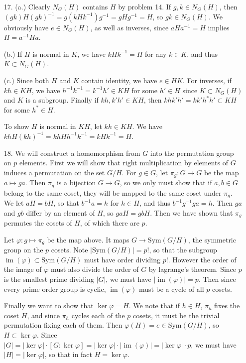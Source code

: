 \documentclass[11pt, reqno]{article}
\theoremstyle{plain}
\theoremstyle{definition}
\theoremstyle{remark}
\renewcommand{\phi}{\varphi}
\DeclareMathOperator{\ima}{\text{im}}
\begin{document}
\begin{enumerate}
    \item[17.] (a.) Clearly $N_G(H)$ contains $H$ by problem 14. If $g, k \in N_G(H)$, then 
    $(gk)H(gk)^{-1} = g(kHk^{-1})g^{-1} = gHg^{-1} = H$, so $gk \in N_G(H)$. We obviously have $e \in N_G(H)$,
    as well as inverses, since $aHa^{-1} = H$ implies $H = a^{-1} H a$.

    (b.) If $H$ is normal in $K$, we have $kHk^{-1} = H$ for any $k \in K$, and thus $K \subset N_G(H)$. 

    (c.) Since both $H$ and $K$ contain identity, we have $e \in HK$. For inverses, if $kh \in KH$,
    we have $h^{-1}k^{-1} = k^{-1}h' \in KH$ for some $h' \in H$ since $K \subset N_G(H)$ and $K$
    is a subgroup. Finally if $kh, k'h' \in KH$, then $khk'h' = kk'h^*h' \subset KH$ for some $h^* \in H$.

    To show $H$ is normal in $KH$, let $kh \in KH$. We have $kh H (kh)^{-1} = kh H h^{-1} k^{-1} = k H k^{-1} = H$.

    \item[18.] We will construct a homomorphism from $G$ into the permutation group on $p$ elements. 
    First we will show that right multiplication by elements of $G$ induces a permutation on the set $G/H$.
    For $g \in G$, let $\pi_g: G \rightarrow G$ be the map $a \mapsto ga$. Then $\pi_g$ 
    is a bijection $G \rightarrow G$, so we only must show that if $a, b \in G$ belong to the same coset, 
    they will be mapped to the same coset under $\pi_g$. We let $aH = bH$, so that $b^{-1}a = h$ for $h \in H$,
    and thus $b^{-1}g^{-1}ga = h$. Then $ga$ and $gb$ differ by an element of $H$, so $gaH = gbH$. Then we have
    shown that $\pi_g$ permutes the cosets of $H$, of which there are $p$. 

    Let $\phi: g \mapsto \pi_g$ be the map above. It maps $G \rightarrow \text{Sym}(G/H)$, the symmetric group 
    on the $p$ cosets. Note $|\text{Sym}(G/H)| = p!$, so that the subgroup $\ima(\phi) \subset \text{Sym}(G/H)$
    must have order dividing $p!$. 
    However the order of the image of $\phi$ must also divide the order of $G$
    by lagrange's theorem. Since $p$ is the smallest prime dividing $|G|$, we must have $|\ima(\phi)| = p$.
    Then since every prime order group is cyclic, $\ima(\phi)$ must be a cycle of all $p$ cosets. 

    Finally we want to show that $\ker\phi = H$. We note that if $h \in H$, $\pi_h$ fixes the coset $H$,
    and since $\pi_h$ cycles each of the $p$ cosets, it must be the trivial permutation fixing each of them. 
    Then $\phi(H) = e \in \text{Sym}(G/H)$, so $H \subset \ker \phi$. Since $|G| = |\ker\phi|\cdot[G: \ker\phi]
    = |\ker\phi|\cdot |\ima(\phi)| = |\ker\phi|\cdot p$, we must have $|H| = |\ker\phi|$, so that in fact 
    $H = \ker\phi$. 
    

\end{enumerate}
\end{document}
